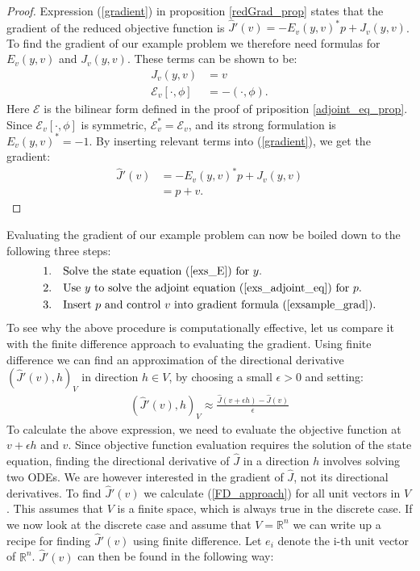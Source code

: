 \begin{proof}
Expression (\ref{gradient}) in proposition \ref{redGrad_prop} states that the gradient of the reduced objective function is $\hat J'(v) = -E_v(y,v)^*p + J_v(y,v)$. To find the gradient of our example problem we therefore need formulas for $E_v(y,v)$ and $J_v(y,v)$. These terms can be shown to be:
\begin{align*}
J_v(y,v) &= v \\
\mathcal{E}_v[\cdot,\phi] &= -(\cdot,\phi).
\end{align*}
Here $\mathcal{E}$ is the bilinear form defined in the proof of priposition \ref{adjoint_eq_prop}. Since $\mathcal{E}_v[\cdot,\phi]$ is symmetric, $\mathcal{E}_v^*=\mathcal{E}_v$, and its strong formulation is $E_v(y,v)^*=-1$. By inserting relevant terms into (\ref{gradient}), we get the gradient:
\begin{align}
\hat{J}'(v)&=-E_v(y,v)^*p + J_v(y,v) \\
&= p+v. \label{exs_grad}
\end{align} 
\end{proof}
\noindent
Evaluating the gradient of our example problem can now be boiled down to the following three steps:
\begin{align*}
1.\quad & \textrm{Solve the state equation (\ref{exs_E}) for $y$. }\\
2.\quad & \textrm{Use $y$ to solve the adjoint equation (\ref{exs_adjoint_eq}) for $p$. }\\
3.\quad & \textrm{Insert $p$ and control $v$ into gradient formula (\ref{exsample_grad}).}
\end{align*}
To see why the above procedure is computationally effective, let us compare it with the finite difference approach to evaluating the gradient. Using finite difference we can find an approximation of the directional derivative $(\hat J'(v),h)_V$ in direction $h\in V$, by choosing a small $\epsilon>0$ and setting:
\begin{align}
(\hat J'(v), h)_V\approx\frac{\hat J(v+\epsilon h)-\hat J(v)}{\epsilon} \label{FD_approach}
\end{align} 
To calculate the above expression, we need to evaluate the objective function at $v+\epsilon h$ and $v$. Since objective function evaluation requires the solution of the state equation, finding the directional derivative of $\hat J$ in a direction $h$ involves solving two ODEs. We are however interested in the gradient of $\hat J$, not its directional derivatives. To find $\hat J'(v)$ we calculate (\ref{FD_approach}) for all unit vectors in $V$. This assumes that $V$ is a finite space, which is always true in the discrete case. If we now look at the discrete case and assume that $V=\mathbb{R}^n$ we can write up a recipe for finding $\hat J'(v)$ using finite difference. Let $e_i$ denote the i-th unit vector of $\mathbb{R}^n$. $\hat J'(v)$ can then be found in the following way:
